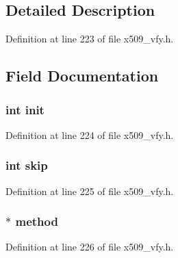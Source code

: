 \subsection{Detailed Description}


Definition at line 223 of file x509\+\_\+vfy.\+h.



\subsection{Field Documentation}
\subsubsection[{\texorpdfstring{init}{init}}]{\setlength{\rightskip}{0pt plus 5cm}int init}\hypertarget{structx509__lookup__st_a795ea50921b36311ffd5e7baa2ef1f7e}{}\label{structx509__lookup__st_a795ea50921b36311ffd5e7baa2ef1f7e}


Definition at line 224 of file x509\+\_\+vfy.\+h.

\subsubsection[{\texorpdfstring{skip}{skip}}]{\setlength{\rightskip}{0pt plus 5cm}int skip}\hypertarget{structx509__lookup__st_a13f77b252237844d7b8b6e3c3047fe50}{}\label{structx509__lookup__st_a13f77b252237844d7b8b6e3c3047fe50}


Definition at line 225 of file x509\+\_\+vfy.\+h.

\subsubsection[{\texorpdfstring{method}{method}}]{ $\ast$ method}\hypertarget{structx509__lookup__st_a95febc2187ab802f9765b96d200372b2}{}\label{structx509__lookup__st_a95febc2187ab802f9765b96d200372b2}


Definition at line 226 of file x509\+\_\+vfy.\+h.

